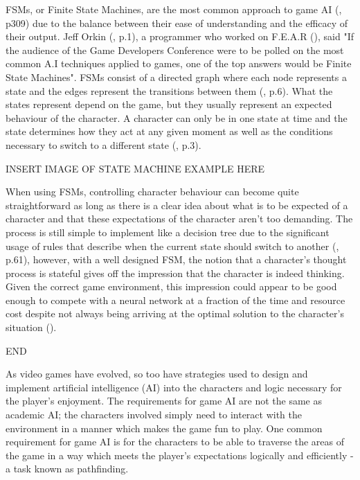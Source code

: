 \documentclass[10pt]{article}
\begin{document}
FSMs, or Finite State Machines, are the most common approach to game AI (\cite{millington2019ai}, p309) due to the balance between their ease of understanding and the efficacy of their output. Jeff Orkin (\citeyear{orkin2006three}, p.1), a programmer who worked on F.E.A.R (\cite{FEAR}), said "If the audience of the Game Developers Conference were to be polled on the most common A.I techniques applied to games, one of the top answers would be Finite State Machines". FSMs consist of a directed graph where each node represents a state and the edges represent the transitions between them (\cite{tozour2002evolution}, p.6). What the states represent depend on the game, but they usually represent an expected behaviour of the character. A character can only be in one state at time and the state determines how they act at any given moment as well as the conditions necessary to switch to a different state (\cite{diller2004behavior}, p.3).

INSERT IMAGE OF STATE MACHINE EXAMPLE HERE

When using FSMs, controlling character behaviour can become quite straightforward as long as there is a clear idea about what is to be expected of a character and that these expectations of the character aren't too demanding. The process is still simple to implement like a decision tree due to the significant usage of rules that describe when the current state should switch to another (\cite{nareyek2004ai}, p.61), however, with a well designed FSM, the notion that a character's thought process is stateful gives off the impression that the character is indeed thinking. Given the correct game environment, this impression could appear to be good enough to compete with a neural network at a fraction of the time and resource cost despite not always being arriving at the optimal solution to the character's situation (\cite{sweetser2002current}).

END

As video games have evolved, so too have strategies used to design and implement artificial intelligence (AI) into the characters and logic necessary for the player's enjoyment. The requirements for game AI are not the same as academic AI; the characters involved simply need to interact with the environment in a manner which makes the game fun to play. One common requirement for game AI is for the characters to be able to traverse the areas of the game in a way which meets the player's expectations logically and efficiently - a task known as pathfinding.
\end{document}
